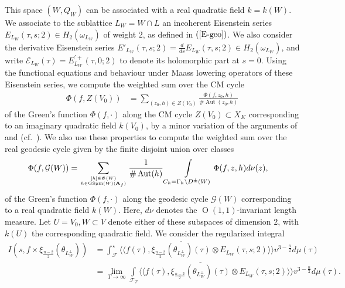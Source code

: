 \documentclass{amsart}
\theoremstyle{definition}
\theoremstyle{definition}
\theoremstyle{definition}
\begin{document}
This space $(W, Q_W)$ can be associated with a real quadratic field $k = k(W)$. 
We associate to the sublattice $L_W = W \cap L$ an incoherent Eisenstein series 
$E_{L_W}(\tau, s; 2) \in H_2(\omega_{L_W})$ of weight $2$, as defined in $(\ref{E-geo})$. 
We also consider the derivative Eisenstein series $E'_{L_W}(\tau, s; 2) = \frac{d}{ds} E_{L_W}(\tau, s; 2) \in H_2(\omega_{L_W})$, and write
$\mathcal{E}_{L_W}(\tau) = E^{\prime +}_{L_W}(\tau, 0; 2)$ to denote its holomorphic part at $s=0$. 
Using the functional equations and behaviour under Maass lowering operators of these Eisenstein series, we compute the weighted sum over the CM cycle %
\begin{align*} \Phi(f, Z(V_0)) &= \sum\limits_{(z_0, h) \in Z(V_0)} \frac{\Phi(f, z_0, h)}{\# \operatorname{Aut}(z_0, h)} \end{align*}
of the Green's function $\Phi(f, \cdot)$ along the CM cycle $Z(V_0) \subset X_K$ corresponding to an 
imaginary quadratic field $k(V_0)$, by a minor variation of the arguments of \cite[Theorem 4.7]{BY} and \cite{Sch} 
(cf.~\cite[Theorem 5.7.1]{AGHMP}). We also use these properties to compute the weighted sum over the real geodesic cycle given by the finite disjoint union over classes 
\begin{align*} \Phi(f, \mathcal{G}(W)) 
&= \sum\limits_{ [h] \in \mathfrak{G}(W) \atop h \in \operatorname{GSpin}(W)({\bf{A}}_f)} \frac{1}{\# \operatorname{Aut}(h)} 
\int\limits_{C_h = \Gamma_h \backslash D^{\pm}(W)} 
\Phi(f, z, h) d \nu(z), \end{align*} 
of the Green's function $\Phi(f, \cdot)$ along the geodesic cycle $\mathcal{G}(W)$ corresponding to a real quadratic field $k(W)$.
Here, $d \nu$ denotes the $\operatorname{O}(1,1)$-invariant length measure. 
Let $U = V_0, W \subset V$ denote either of these subspaces of dimension $2$, with $k(U)$ the corresponding quadratic field. We consider the regularized integral 
\begin{equation*}\begin{aligned} I(s, f \times \xi_{\frac{n-2}{2}}(\theta_{L_W^{\perp}})) &=
\int_{\mathcal{F}}^{\star} \langle \langle f(\tau), \overline{\xi_{\frac{n-2}{2}}( \theta_{ L_W^{\perp} }  )(\tau)} \otimes E_{L_W}(\tau, s; 2) \rangle \rangle v^{3 - \frac{n}{2}} d \mu (\tau) \\
&= \lim_{T \rightarrow \infty} \int\limits_{ \mathcal{F}_T}  \langle \langle f(\tau), \overline{\xi_{\frac{n-2}{2}}(\theta_{L_W^{\perp} } )(\tau)} \otimes E_{L_W}(\tau, s; 2) \rangle \rangle v^{3- \frac{n}{2}} d \mu(\tau). 
\end{aligned}\end{equation*}
\end{document}
